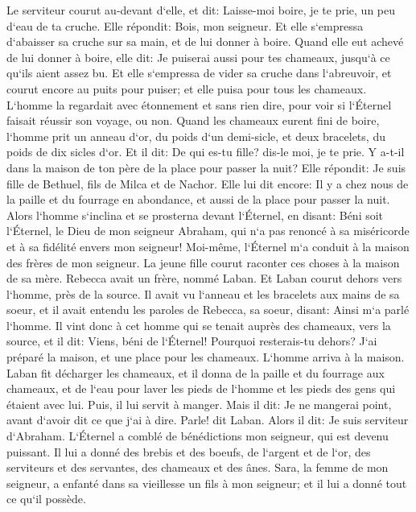\verse Le serviteur courut au-devant d`elle, et dit: Laisse-moi boire, je te prie, un peu d`eau de ta cruche. 
\verse Elle répondit: Bois, mon seigneur. Et elle s`empressa d`abaisser sa cruche sur sa main, et de lui donner à boire. 
\verse Quand elle eut achevé de lui donner à boire, elle dit: Je puiserai aussi pour tes chameaux, jusqu`à ce qu`ils aient assez bu. 
\verse Et elle s`empressa de vider sa cruche dans l`abreuvoir, et courut encore au puits pour puiser; et elle puisa pour tous les chameaux. 
\verse L`homme la regardait avec étonnement et sans rien dire, pour voir si l`Éternel faisait réussir son voyage, ou non. 
\verse Quand les chameaux eurent fini de boire, l`homme prit un anneau d`or, du poids d`un demi-sicle, et deux bracelets, du poids de dix sicles d`or. 
\verse Et il dit: De qui es-tu fille? dis-le moi, je te prie. Y a-t-il dans la maison de ton père de la place pour passer la nuit? 
\verse Elle répondit: Je suis fille de Bethuel, fils de Milca et de Nachor. 
\verse Elle lui dit encore: Il y a chez nous de la paille et du fourrage en abondance, et aussi de la place pour passer la nuit. 
\verse Alors l`homme s`inclina et se prosterna devant l`Éternel, 
\verse en disant: Béni soit l`Éternel, le Dieu de mon seigneur Abraham, qui n`a pas renoncé à sa miséricorde et à sa fidélité envers mon seigneur! Moi-même, l`Éternel m`a conduit à la maison des frères de mon seigneur. 
\verse La jeune fille courut raconter ces choses à la maison de sa mère. 
\verse Rebecca avait un frère, nommé Laban. Et Laban courut dehors vers l`homme, près de la source. 
\verse Il avait vu l`anneau et les bracelets aux mains de sa soeur, et il avait entendu les paroles de Rebecca, sa soeur, disant: Ainsi m`a parlé l`homme. Il vint donc à cet homme qui se tenait auprès des chameaux, vers la source, 
\verse et il dit: Viens, béni de l`Éternel! Pourquoi resterais-tu dehors? J`ai préparé la maison, et une place pour les chameaux. 
\verse L`homme arriva à la maison. Laban fit décharger les chameaux, et il donna de la paille et du fourrage aux chameaux, et de l`eau pour laver les pieds de l`homme et les pieds des gens qui étaient avec lui. 
\verse Puis, il lui servit à manger. Mais il dit: Je ne mangerai point, avant d`avoir dit ce que j`ai à dire. Parle! dit Laban. 
\verse Alors il dit: Je suis serviteur d`Abraham. 
\verse L`Éternel a comblé de bénédictions mon seigneur, qui est devenu puissant. Il lui a donné des brebis et des boeufs, de l`argent et de l`or, des serviteurs et des servantes, des chameaux et des ânes. 
\verse Sara, la femme de mon seigneur, a enfanté dans sa vieillesse un fils à mon seigneur; et il lui a donné tout ce qu`il possède. 

